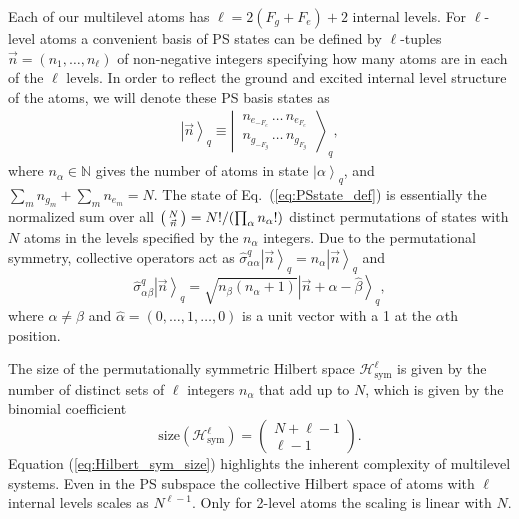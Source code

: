 \documentclass[aps,prx,superscriptaddress,twocolumn,notitlepage,nofootinbib,longbibliography]{revtex4-2}
\newcommand{\ket}[1]{\left|#1\right>}
\newcommand{\qusub}{q}
\begin{document}
Each of our multilevel atoms has $\ell = 2(F_g+F_e)+2$ internal levels.
For $\ell$-level atoms a convenient basis of PS states can be defined by $\ell$-tuples $\vec{n}=(n_1,\ldots,n_\ell)$ of non-negative integers specifying how many atoms are in each of the $\ell$ levels. In order to reflect the ground and excited internal level structure of the atoms, we will denote these PS basis states as
\begin{align}
    \ket{\vec{n}}_q \equiv \left|\, \begin{matrix} n_{e_{-F_e}}\, \ldots\, n_{e_{F_e}} \\ n_{g_{-F_g}}\, \ldots\, n_{g_{F_g}} \end{matrix} \,\right\rangle_{\qusub} ,
\label{eq:PSstate_def}
\end{align}
where $n_\alpha\in\mathbb{N}$ gives the number of atoms in state $\ket{\alpha}_{\qusub}$, and $\sum_m n_{g_m} + \sum_m n_{e_m} = N$. The state of Eq.~(\ref{eq:PSstate_def}) is essentially the normalized sum over all $\begin{psmallmatrix} N \\ \vec{n} \end{psmallmatrix}=N!/(\prod_\alpha n_\alpha!)$ distinct permutations of states with $N$ atoms in the levels specified by the $n_\alpha$ integers.
Due to the permutational symmetry, collective operators act as $\hat{\sigma}^\qusub_{\alpha \alpha} \ket{\vec{n}}_\qusub = n_\alpha \ket{\vec{n}}_\qusub$ and 
\begin{equation}
    \hat{\sigma}^\qusub_{\alpha \beta} \ket{\vec{n}}_\qusub = \sqrt{n_\beta(n_\alpha+1)} \ket{\vec{n}+\hat{\alpha}-\hat{\beta}}_\qusub,
\label{eq:collective_op_PS_state}
\end{equation}
where $\alpha\neq\beta$ and $\hat{\alpha}=(0,\ldots,1,\ldots,0)$ is a unit vector with a 1 at the $\alpha$th position.


The size of the permutationally symmetric Hilbert space $\mathcal{H}_\text{sym}^{\ell}$ is given by the number of distinct sets of $\ell$ integers $n_\alpha$ that add up to $N$, which is given by the binomial coefficient
\begin{equation}
	\text{size} \left( \mathcal{H}_\text{sym}^{\ell} \right) = \begin{pmatrix} N+\ell-1 \\ \ell-1 \end{pmatrix}.
\label{eq:Hilbert_sym_size}
\end{equation}
Equation (\ref{eq:Hilbert_sym_size}) highlights the inherent complexity of multilevel systems. Even in the PS subspace  
the collective Hilbert space of atoms with $\ell$ internal levels scales as $N^{\ell-1}$. Only for  2-level atoms the scaling is  linear with $N$.
\end{document}
